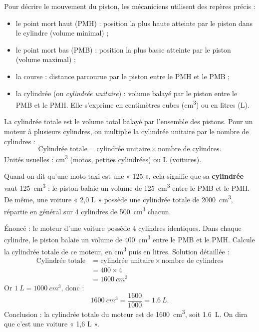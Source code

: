 \documentclass[11pt]{article}
\newcommand{\cle}[1]{{\popxbold\color{popdark}#1}}
\begin{document}
Pour décrire le mouvement du piston, les mécaniciens utilisent des repères précis :

\begin{definition}
\begin{itemize}
\item le \cle{point mort haut (PMH)} : position la plus haute atteinte par le piston dans le cylindre (volume minimal) ;
\item le \cle{point mort bas (PMB)} : position la plus basse atteinte par le piston (volume maximal) ;
\item la \cle{course} : distance parcourue par le piston entre le PMH et le PMB ;
\item la \cle{cylindrée} (ou \emph{cylindrée unitaire}) : volume balayé par le piston entre le PMB et le PMH. Elle s'exprime en centimètres cubes (\si{cm^3}) ou en litres (\si{L}).
\end{itemize}
\end{definition}

\begin{aretenir}
La cylindrée totale est le volume total balayé par l'ensemble des pistons. Pour un moteur à plusieurs cylindres, on multiplie la cylindrée unitaire par le nombre de cylindres :
\[ \text{Cylindrée totale} = \text{cylindrée unitaire} \times \text{nombre de cylindres}. \]
Unités usuelles : \si{cm^3} (motos, petites cylindrées) ou \si{L} (voitures).
\end{aretenir}

\begin{exemplebox}
Quand on dit qu'une moto-taxi est une « 125 », cela signifie que sa \textbf{cylindrée} vaut \SI{125}{cm^3} : le piston balaie un volume de \SI{125}{cm^3} entre le PMB et le PMH. De même, une voiture « 2,0 L » possède une cylindrée totale de \SI{2000}{cm^3}, répartie en général sur 4 cylindres de \SI{500}{cm^3} chacun.
\end{exemplebox}

\begin{exoresolu}
Énoncé : le moteur d'une voiture possède 4 cylindres identiques. Dans chaque cylindre, le piston balaie un volume de \SI{400}{cm^3} entre le PMB et le PMH. Calcule la cylindrée totale de ce moteur, en \si{cm^3} puis en litres.
\tcblower
Solution détaillée :
\begin{align*}
\text{Cylindrée totale} &= \text{cylindrée unitaire} \times \text{nombre de cylindres} \\
&= 400 \times 4 \\
&= \SI{1600}{cm^3}
\end{align*}
Or $\SI{1}{L} = \SI{1000}{cm^3}$, donc :
\[ \SI{1600}{cm^3} = \frac{1600}{1000} = \SI{1,6}{L}. \]
Conclusion : la cylindrée totale du moteur est de \SI{1600}{cm^3}, soit \SI{1,6}{L}. On dira que c'est une voiture « 1,6 L ».
\end{exoresolu}
\end{document}
